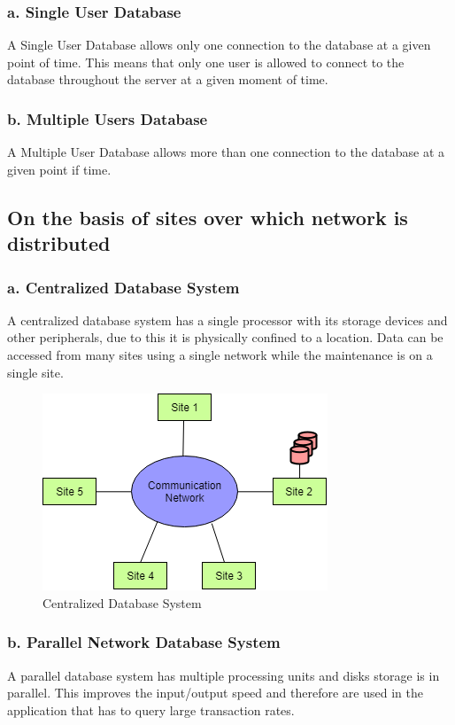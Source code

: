 \documentclass[BTech]{srmuthesis}
\begin{document}
\subsubsection{a. Single User Database}
A Single User Database allows only one connection to the database at a given point of time. This means that only one user is allowed to connect to the database throughout the server at a given moment of time.
\subsubsection{b. Multiple Users Database}
A Multiple User Database allows more than one connection to the database at a given point if time.
\subsection{On the basis of sites over which network is distributed}
\subsubsection{a. Centralized Database System}
A centralized database system has a single processor with its storage devices and other peripherals, due to this it is physically confined to a location. Data can be accessed from many sites using a single network while the maintenance is on a single site. 
\begin{figure}[h!]
	\centering
	\includegraphics[scale=0.7]{CenterslizedDB.png}
	\caption{Centralized Database System}
\end{figure}
\subsubsection{b. Parallel Network Database System}
A parallel database system has multiple processing units and disks storage is in parallel. This improves the input/output speed and therefore are used in the application that has to query large transaction rates.
\end{document}
